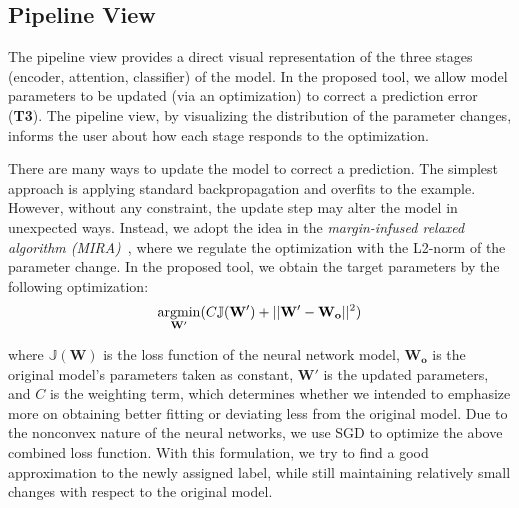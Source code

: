 \subsection{Pipeline View}
\label{sec:pipeline}
The pipeline view provides a direct visual representation of the three stages (encoder, attention, classifier) of the model. In the proposed tool, we allow model parameters to be updated (via an optimization) to correct a prediction error (\textbf{T3}). The pipeline view, by visualizing the distribution of the parameter changes, informs the user about how each stage responds to the optimization.

There are many ways to update the model to correct a prediction. The simplest approach is applying standard backpropagation and overfits to the example. However, without any constraint, the update step may alter the model in unexpected ways.
Instead, we adopt the idea in the \emph{margin-infused relaxed algorithm (MIRA)}~\cite{CrammerSinger2003}, where we regulate the optimization with the L2-norm of the parameter change. In the proposed tool, we obtain the target parameters by the following optimization:
\vspace{-0.3mm}
\begin{equation}
\vspace{-1.2mm}
\underset{\mathbf{W}'}{\mathrm{argmin}}( C \mathbb{J}(\mathbf{W}') + ||\mathbf{W}' - \mathbf{W_o}||^2)
\end{equation}

where $\mathbb{J}(\mathbf{W})$ is the loss function of the neural network model, $\mathbf{W_o}$ is the original model's parameters taken as constant, $\mathbf{W}'$ is the updated parameters, and $C$ is the weighting term, which determines whether we intended to emphasize more on obtaining better fitting or deviating less from the original model. Due to the nonconvex nature of the neural networks, we use SGD to optimize the above combined loss function.
%
With this formulation, we try to find a good approximation to the newly assigned label, while still maintaining relatively small changes with respect to the original model.

